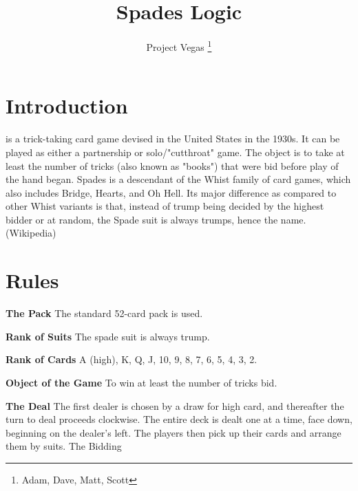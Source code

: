 \documentclass[journal, a4paper]{IEEEtran}
\begin{document}
	\title{Spades Logic}
	\author{Project Vegas
	\thanks{Adam, Dave, Matt, Scott}}
	\maketitle



\section{Introduction}
	 is a trick-taking card game devised in the United States in the 1930s. It can be played as either a partnership or solo/"cutthroat" game. The object is to take at least the number of tricks (also known as "books") that were bid before play of the hand began. Spades is a descendant of the Whist family of card games, which also includes Bridge, Hearts, and Oh Hell. Its major difference as compared to other Whist variants is that, instead of trump being decided by the highest bidder or at random, the Spade suit is always trumps, hence the name. (Wikipedia)

\section{Rules}
	
\textbf{The Pack} \newline
The standard 52-card pack is used.\newline

\textbf{Rank of Suits} \newline
The spade suit is always trump.\newline

\textbf{Rank of Cards}\newline
A (high), K, Q, J, 10, 9, 8, 7, 6, 5, 4, 3, 2.\newline

\textbf{Object of the Game}\newline
To win at least the number of tricks bid.\newline

\textbf{The Deal} \newline
The first dealer is chosen by a draw for high card, and thereafter the turn to deal proceeds clockwise. The entire deck is dealt one at a time, face down, beginning on the dealer's left. The players then pick up their cards and arrange them by suits.
The Bidding
\end{document}
